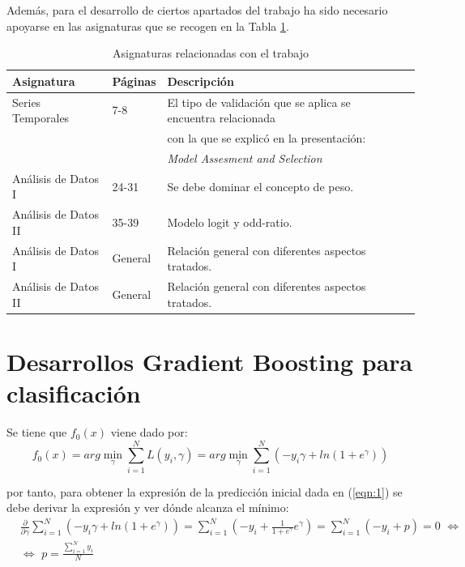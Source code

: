 \documentclass[12pt,twoside]{article}
\begin{document}
Además, para el desarrollo de ciertos apartados del trabajo ha sido necesario apoyarse en las asignaturas que se recogen en la Tabla \ref{tab{03}}.
\begin{table}[ht] 
\centering
\begin{tabular}{llll} 
  \hline
 Asignatura & Páginas & Descripción  \\ 
  \hline
Series Temporales & 7-8 & El tipo de validación que se aplica se encuentra relacionada  \\ 
 &  &  con la que se explicó en la presentación: \\ 
 &  & \textit{Model Assesment and Selection} \\ 
Análisis de Datos I & 24-31 & Se debe dominar el concepto de peso. \\
Análisis de Datos II & 35-39 & Modelo logit y odd-ratio.\\ 
Análisis de Datos I & General & Relación general con diferentes aspectos tratados. \\
Análisis de Datos II & General & Relación general con diferentes aspectos tratados. \\
\hline
\end{tabular}
\caption{Asignaturas relacionadas con el trabajo} \label{tab{03}}
\end{table}




\newpage
\section{Desarrollos Gradient Boosting para clasificación} \label{Anexo2}

Se tiene que $f_0(x)$ viene dado por:
\begin{equation*}
f_0(x) = arg\min_{\gamma} \sum_{i=1}^N L(y_i, \gamma) = arg\min_{\gamma} \sum_{i=1}^N \left( -y_i \gamma + ln \left( 1 + e^{\gamma} \right) \right)
\end{equation*}

\noindent
por tanto, para obtener la expresión de la predicción inicial dada en (\ref{eqn:1}) se debe derivar la expresión y ver dónde alcanza el mínimo:
\begin{equation*}
\begin{split}
& \frac{\partial}{\partial \gamma}\sum_{i=1}^N \left( -y_i \gamma + ln \left( 1 + e^{\gamma} \right) \right) = \sum_{i=1}^N \left( -y_i + \frac{1}{1 + e^{\gamma}} e^{\gamma} \right) = \sum_{i=1}^N (-y_i + p) = 0 \, \, \Leftrightarrow  \\
& \Leftrightarrow \, \, p = \frac{\sum_{i=1}^{N} y_i}{N} 
\end{split}
\end{equation*}
\end{document}
